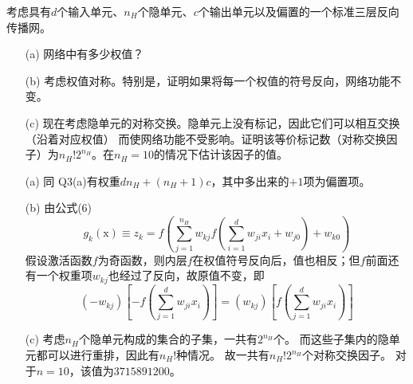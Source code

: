 \documentclass[reportComp]{thesis}
\begin{document}
\begin{question}[\textsection 6 Q8]
考虑具有$d$个输入单元、$n_H$个隐单元、$c$个输出单元以及偏置的一个标准三层反向传播网。
\begin{itemize}
	\item [(a)] 网络中有多少权值？
	\item [(b)] 考虑权值对称。特别是，证明如果将每一个权值的符号反向，网络功能不变。
	\item [(c)] 现在考虑隐单元的对称交换。隐单元上没有标记，因此它们可以相互交换（沿着对应权值）
	而使网络功能不受影响。证明该等价标记数（对称交换因子）为$n_H!2^{n_H}$。在$n_H=10$的情况下估计该因子的值。
\end{itemize}
\end{question}
\begin{answer}
\begin{itemize}
	\item [(a)] 同 Q3(a)有权重$dn_H+(n_H+1)c$，其中多出来的$+1$项为偏置项。
	\item [(b)] 由公式(6)
	\[g_{k}(\mathrm{x}) \equiv z_{k}=f\left(\sum_{j=1}^{n_{H}} w_{k j} f\left(\sum_{i=1}^{d} w_{j i} x_{i}+w_{j 0}\right)+w_{k 0}\right)\]
	假设激活函数$f$为奇函数，则内层$f$在权值符号反向后，值也相反；但$f$前面还有一个权重项$w_{kj}$也经过了反向，故原值不变，即
	\[\left(-w_{k j}\right)\left[-f\left(\sum_{j=1}^{d} w_{j i} x_{i}\right)\right]=\left(w_{k j}\right)\left[f\left(\sum_{j=1}^{d} w_{j i} x_{i}\right)\right]\]
	\item [(c)] 考虑$n_H$个隐单元构成的集合的子集，一共有$2^{n_H}$个。
	而这些子集内的隐单元都可以进行重排，因此有$n_H!$种情况。
	故一共有$n_H!2^{n_H}$个对称交换因子。
	对于$n=10$，该值为$3715891200$。
\end{itemize}
\end{answer}
\end{document}
